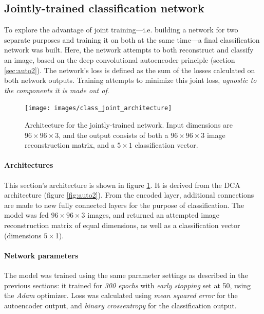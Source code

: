 
\subsection{Jointly-trained classification network}
\label{sec:class_joint}

To explore the advantage of joint training---i.e. building a network for two separate purposes and training it on both at the same time---a final classification network was built. Here, the network attempts to both reconstruct and classify an image, based on the deep convolutional autoencoder principle (section \textcolor{blue}{\ref{sec:auto2}}). The network's loss is defined as the sum of the losses calculated on both network outputs. Training attempts to minimize this joint loss, \textit{agnostic to the components it is made out of}.


\begin{figure}[!htbp]
	\begin{center}
		\texttt{[image: images/class\_joint\_architecture]}
		\caption{Architecture for the jointly-trained network. Input dimensions are $96\times 96\times3$, and the output consists of both a $96\times 96\times3$ image reconstruction matrix, and a $5\times1$ classification vector. }
		\label{fig:class_joint}
	\end{center}
\end{figure}

\paragraph{Architectures} 
This section's architecture is shown in figure \ref{fig:class_joint}. It is derived from the DCA architecture (figure \ref{fig:auto2}). From the encoded layer, additional connections are made to new fully connected layers for the purpose of classification. The model was fed $96\times 96\times3$ images, and returned an attempted image reconstruction matrix of equal dimensions, as well as a classification vector (dimensions $5 \times $1).


\paragraph{Network parameters} The model was trained using the same parameter settings as described in the previous sections: it trained for \textit{300 epochs} with \textit{early stopping} set at 50, using the \textit{Adam} optimizer. Loss was calculated using \textit{mean squared error} for the autoencoder output, and \textit{binary crossentropy} for the classification output.


